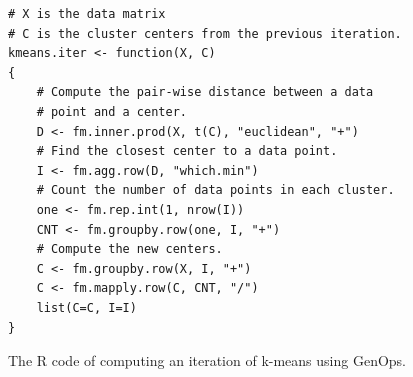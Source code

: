 \begin{figure}[t]
\begin{verbatim}
# X is the data matrix
# C is the cluster centers from the previous iteration.
kmeans.iter <- function(X, C)
{
	# Compute the pair-wise distance between a data
	# point and a center.
	D <- fm.inner.prod(X, t(C), "euclidean", "+")
	# Find the closest center to a data point.
	I <- fm.agg.row(D, "which.min")
	# Count the number of data points in each cluster.
	one <- fm.rep.int(1, nrow(I))
	CNT <- fm.groupby.row(one, I, "+")
	# Compute the new centers.
	C <- fm.groupby.row(X, I, "+")
	C <- fm.mapply.row(C, CNT, "/")
	list(C=C, I=I)
}
\end{verbatim}
\vspace{-5pt}
\caption{The R code of computing an iteration of k-means using GenOps.}
\label{fig:kmeans}
\end{figure}

